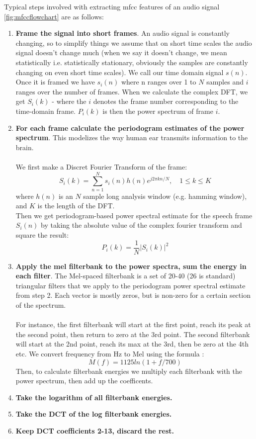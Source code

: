 \documentclass{article} %
\begin{document}
		Typical steps involved with extracting mfcc features of an audio signal \ref{fig:mfccflowchart} are as follows:
		\begin{enumerate}
		    \item \textbf{Frame the signal into short frames}.  An audio signal is constantly changing, so to simplify things we assume that on short time scales the audio signal doesn't change much (when we say it doesn't change, we mean statistically i.e. statistically stationary, obviously the samples are constantly changing on even short time scales). 
        We call our time domain signal $s(n)$. Once it is framed we have $s_i(n)$ where n ranges over 1 to $N$ samples and $i$ ranges over the number of frames. When we calculate the complex DFT, we get $S_i(k)$ - where the $i$ denotes the frame number corresponding to the time-domain frame. $P_i(k)$ is then the power spectrum of frame $i$.\\
		    \item \textbf{For each frame calculate the periodogram estimates of the power spectrum}. This modelizes the way human ear transmits information to the brain.\\\\
		We first make a Discret Fourier Transform of the frame:\\
		$$S_i(k) = \displaystyle\sum_{n=1}^N s_i(n)h(n)e^{j2\pi kn /N}, \quad 1 \leq k \leq K$$
		where $h(n)$ is an $N$ sample long analysis window (e.g. hamming window), and $K$ is the length of the DFT.\\
		Then we get periodogram-based power spectral estimate for the speech frame $S_i(n)$ by taking the absolute value of the complex fourier transform and square the result:\\
		$$P_i(k) = \frac{1}{N} |S_i(k)|^2$$
		    \item \textbf{Apply the mel filterbank to the power spectra, sum the energy in each filter}. The Mel-spaced filterbank  is a set of 20-40 (26 is standard) triangular filters that we apply to the periodogram power spectral estimate from step 2. Each vector is mostly zeros, but is non-zero for a certain section of the spectrum. \\\\
		For instance, the first filterbank will start at the first point, reach its peak at the second point, then return to zero at the 3rd point. The second filterbank will start at the 2nd point, reach its max at the 3rd, then be zero at the 4th etc.
		We convert frequency from Hz to Mel using the formula :
		$$ M(f) = 1125 ln(1 + f/700) $$
		Then, to calculate filterbank energies we multiply each filterbank with the power spectrum, then add up the coefficents.

		    \item \textbf{Take the logarithm of all filterbank energies.}
		    \item \textbf{Take the DCT of the log filterbank energies.}
		    \item \textbf{Keep DCT coefficients 2-13, discard the rest.}
		\end{enumerate}
\end{document}
